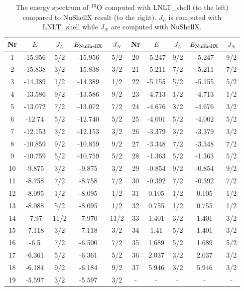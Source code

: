 \begin{table}[h]
\caption{The energy spectrum of $^{19}\rm{O}$ computed with LNLT\_shell (to the left) compared to NuShellX result (to the right). \(J_L\) is computed with LNLT\_shell while \(J_N\) are computed with NuShellX.}
\label{tab:ox19}
\begin{tabular}{|c|c|c|c|c||c|c|c|c|c|}
\hline Nr & \(E\) & \(J_{L}\) & \(E_{\rm{NuShellX}}\) & \(J_{N}\) & Nr & \(E\) & \(J_{L}\) & \(E_{\rm{NuShellX}}\) & \(J_{N}\) \\
\hline 1   & -15.956 &       5/2 & -15.956 & 5/2 & 20  &  -5.247 &       9/2 & -5.247 & 9/2 \\
\hline 2   & -15.838 &       3/2 & -15.838 & 3/2 & 21  &  -5.211 &       7/2 & -5.211 & 7/2 \\
\hline 3   & -14.389 &       1/2 & -14.389 & 1/2 & 22  &  -5.155 &       5/2 & -5.155 & 5/2 \\
\hline 4   & -13.586 &       9/2 & -13.586 & 9/2 & 23  &  -4.713 &       1/2 & -4.713 & 1/2 \\
\hline 5   & -13.072 &       7/2 & -13.072 & 7/2 & 24  &  -4.676 &       3/2 & -4.676 & 3/2 \\
\hline 6   &  -12.74 &       5/2 & -12.740 & 5/2 & 25  &  -4.001 &       5/2 & -4.002 & 5/2 \\
\hline 7   & -12.153 &       3/2 & -12.153 & 3/2 & 26  &  -3.379 &       3/2 & -3.379 & 3/2 \\
\hline 8   & -10.859 &       9/2 & -10.859 & 9/2 & 27  &  -3.348 &       7/2 & -3.348 & 7/2 \\
\hline 9   & -10.759 &       5/2 & -10.759 & 5/2 & 28  &  -1.363 &       5/2 & -1.363 & 5/2 \\
\hline 10  &  -9.875 &       3/2 & -9.875 & 3/2 & 29  &  -0.854 &       9/2 & -0.854 & 9/2 \\
\hline 11  &  -8.758 &       7/2 & -8.758 & 7/2 & 30  &  -0.392 &       7/2 & -0.392 & 7/2 \\
\hline 12  &  -8.095 &       1/2 & -8.095 & 1/2 & 31  &   0.105 &       1/2 & 0.105 & 1/2 \\
\hline 13  &  -8.088 &       5/2 & -8.095 & 1/2 & 32  &   0.755 &       1/2 & 0.755 & 1/2 \\
\hline 14  &   -7.97 &      11/2 & -7.970 & 11/2 & 33  &   1.401 &       3/2 & 1.401 & 3/2 \\
\hline 15  &  -7.118 &       3/2 & -7.118 & 3/2 & 34  &    1.41 &       5/2 & 1.401 & 3/2 \\
\hline 16  &    -6.5 &       7/2 & -6.500 & 7/2 & 35  &   1.689 &       5/2 & 1.689 & 5/2 \\
\hline 17  &  -6.361 &       5/2 & -6.361 & 5/2 & 36  &   2.037 &       3/2 & 2.037 & 3/2 \\
\hline 18  &  -6.184 &       9/2 & -6.184 & 9/2 & 37  &   5.946 &       3/2 & 5.946 & 3/2 \\
\hline 19  &  -5.597 &       3/2 & -5.597 & 3/2 &  -  &  -  &  -  &  -  &  -  \\
\hline
\end{tabular}
\end{table}

